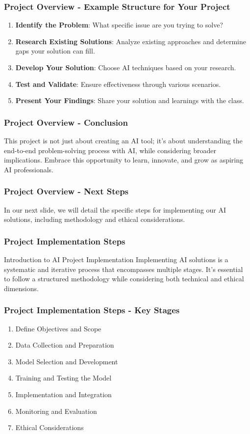 \documentclass[aspectratio=169]{beamer}
\begin{document}
\begin{frame}[fragile]
    \frametitle{Project Overview - Example Structure for Your Project}
    \begin{enumerate}
        \item \textbf{Identify the Problem}: What specific issue are you trying to solve?
        \item \textbf{Research Existing Solutions}: Analyze existing approaches and determine gaps your solution can fill.
        \item \textbf{Develop Your Solution}: Choose AI techniques based on your research.
        \item \textbf{Test and Validate}: Ensure effectiveness through various scenarios.
        \item \textbf{Present Your Findings}: Share your solution and learnings with the class.
    \end{enumerate}
\end{frame}

\begin{frame}[fragile]
    \frametitle{Project Overview - Conclusion}
    This project is not just about creating an AI tool; it’s about understanding the end-to-end problem-solving process with AI, while considering broader implications. 
    Embrace this opportunity to learn, innovate, and grow as aspiring AI professionals.
\end{frame}

\begin{frame}[fragile]
    \frametitle{Project Overview - Next Steps}
    In our next slide, we will detail the specific steps for implementing our AI solutions, including methodology and ethical considerations.
\end{frame}

\begin{frame}
    \frametitle{Project Implementation Steps}
    \begin{block}{Introduction to AI Project Implementation}
        Implementing AI solutions is a systematic and iterative process that encompasses multiple stages. It's essential to follow a structured methodology while considering both technical and ethical dimensions. 
    \end{block}
\end{frame}

\begin{frame}
    \frametitle{Project Implementation Steps - Key Stages}
    \begin{enumerate}
        \item Define Objectives and Scope
        \item Data Collection and Preparation
        \item Model Selection and Development
        \item Training and Testing the Model
        \item Implementation and Integration
        \item Monitoring and Evaluation
        \item Ethical Considerations
    \end{enumerate}
\end{frame}
\end{document}
